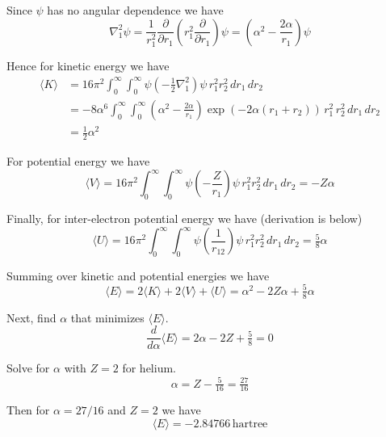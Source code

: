 \documentclass[12pt]{article}
\begin{document}
\noindent
Since $\psi$ has no angular dependence we have
\begin{equation*}
\nabla^2_1\psi=\frac{1}{r_1^2}\frac{\partial}{\partial r_1}
\left(r_1^2\frac{\partial}{\partial r_1}\right)\psi
=\left(\alpha^2-\frac{2\alpha}{r_1}\right)\psi
\end{equation*}

\noindent
Hence for kinetic energy we have
\begin{align*}
\langle K\rangle
&=
16\pi^2\int_0^\infty\int_0^\infty\psi\left(-\frac{1}{2}\nabla_1^2\right)\psi
\,r_1^2r_2^2
\,dr_1\,dr_2
\\
&=-8\alpha^6\int_0^\infty\int_0^\infty
\left(\alpha^2-\frac{2\alpha}{r_1}\right)\exp\left(-2\alpha(r_1+r_2)\right)
\,r_1^2\,r_2^2
\,dr_1\,dr_2
\\
&=\tfrac{1}{2}\alpha^2\tag{2}
\end{align*}

\noindent
For potential energy we have
\begin{equation*}
\langle V\rangle
=
16\pi^2\int_0^\infty\int_0^\infty\psi\left(-\frac{Z}{r_1}\right)\psi
\,r_1^2r_2^2
\,dr_1\,dr_2
=-Z\alpha\tag{3}
\end{equation*}

\noindent
Finally, for inter-electron potential energy we have (derivation is below)
\begin{equation*}
\langle U\rangle
=
16\pi^2\int_0^\infty\int_0^\infty\psi\left(\frac{1}{r_{12}}\right)\psi
\,r_1^2r_2^2
\,dr_1\,dr_2
=\tfrac{5}{8}\alpha
\tag{4}
\end{equation*}

\noindent
Summing over kinetic and potential energies we have
\begin{equation*}
\langle E\rangle=2\langle K\rangle+2\langle V\rangle+\langle U\rangle=\alpha^2-2Z\alpha+\tfrac{5}{8}\alpha
\end{equation*}

\noindent
Next, find $\alpha$ that minimizes $\langle E\rangle$.
\begin{equation*}
\frac{d}{d\alpha}\langle E\rangle=2\alpha-2Z+\tfrac{5}{8}=0
\end{equation*}

\noindent
Solve for $\alpha$ with $Z=2$ for helium.
\begin{equation*}
\alpha=Z-\tfrac{5}{16}=\tfrac{27}{16}
\end{equation*}

\noindent
Then for $\alpha=27/16$ and $Z=2$ we have
\begin{equation*}
\langle E\rangle=-2.84766\,\text{hartree}
\end{equation*}
\end{document}

